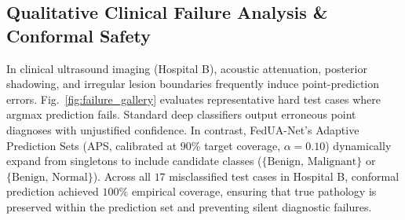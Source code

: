 \documentclass[journal]{IEEEtran}
\begin{document}
\subsection{Qualitative Clinical Failure Analysis \& Conformal Safety}
In clinical ultrasound imaging (Hospital B), acoustic attenuation, posterior shadowing, and irregular lesion boundaries frequently induce point-prediction errors. Fig.~\ref{fig:failure_gallery} evaluates representative hard test cases where argmax prediction fails. Standard deep classifiers output erroneous point diagnoses with unjustified confidence. In contrast, FedUA-Net's Adaptive Prediction Sets (APS, calibrated at $90\%$ target coverage, $\alpha=0.10$) dynamically expand from singletons to include candidate classes ($\{ \text{Benign, Malignant} \}$ or $\{ \text{Benign, Normal} \}$). Across all $17$ misclassified test cases in Hospital B, conformal prediction achieved \textbf{$100\%$} empirical coverage, ensuring that true pathology is preserved within the prediction set and preventing silent diagnostic failures.
\end{document}
